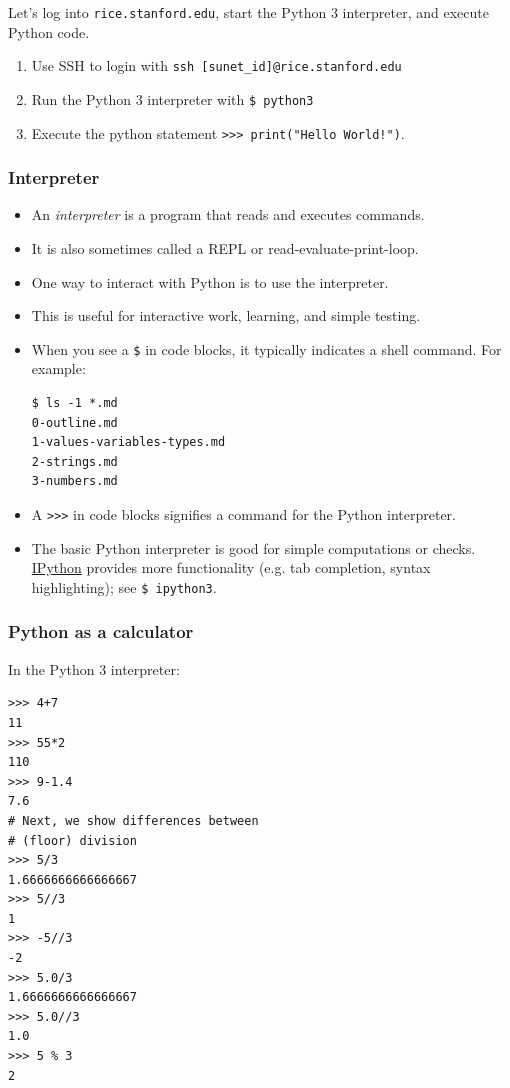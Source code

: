 \documentclass[12pt,letterpaper,twoside]{article}
\begin{document}
Let's log into \texttt{rice.stanford.edu}, start the
Python 3 interpreter, and execute Python code.

\begin{enumerate}
\item Use SSH to login with \texttt{ssh [sunet\_id]@rice.stanford.edu}
\item Run the Python 3 interpreter with \texttt{\$\ python3}
\item Execute the python statement
  \texttt{>>> print("Hello World!")}.
\end{enumerate}

\subsubsection{Interpreter}

\begin{itemize}
\item An \emph{interpreter} is a program that reads and executes commands.
\item It is also sometimes called a REPL or read-evaluate-print-loop.
\item One way to interact with Python is to use the interpreter.
\item This is useful for interactive work, learning, and simple testing.
\item When you see a \texttt{\$} in code blocks, it typically indicates a
  shell command. For example: 

\begin{verbatim}
$ ls -1 *.md
0-outline.md
1-values-variables-types.md
2-strings.md
3-numbers.md
\end{verbatim}

\item
  A \texttt{>>>} in
  code blocks signifies a command for the Python
  interpreter.
\item
  The basic Python interpreter is good for simple computations or
  checks. \href{https://ipython.org/}{IPython} provides more
  functionality (e.g. tab completion, syntax highlighting); see \texttt{\$\ ipython3}.
\end{itemize}

\subsubsection{Python as a calculator}

In the Python 3 interpreter:

\begin{multicols}{2}
\small
\begin{verbatim}
>>> 4+7
11
>>> 55*2
110
>>> 9-1.4
7.6
# Next, we show differences between 
# (floor) division
>>> 5/3
1.6666666666666667
>>> 5//3
1
>>> -5//3
-2
>>> 5.0/3
1.6666666666666667
>>> 5.0//3
1.0
>>> 5 % 3
2
\end{verbatim}
\end{multicols}
\end{document}
